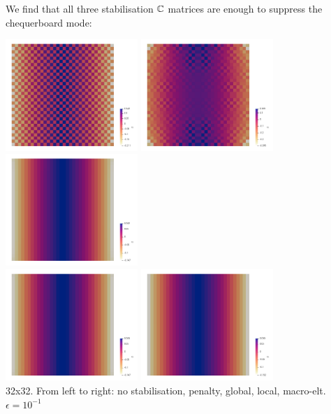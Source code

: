 We find that all three stabilisation ${\mathbb{C}}$ matrices are enough to suppress the chequerboard mode:
\begin{center}
\includegraphics[width=5cm]{python_codes/fieldstone_115/results/dh/p0}
\includegraphics[width=5cm]{python_codes/fieldstone_115/results/dh/p1}
\includegraphics[width=5cm]{python_codes/fieldstone_115/results/dh/p2}\\
\includegraphics[width=5cm]{python_codes/fieldstone_115/results/dh/p3}
\includegraphics[width=5cm]{python_codes/fieldstone_115/results/dh/p4}\\
{\captionfont 32x32. From left to right: no stabilisation, penalty, global, local, macro-elt. $\epsilon=10^{-1}$}
\end{center}


